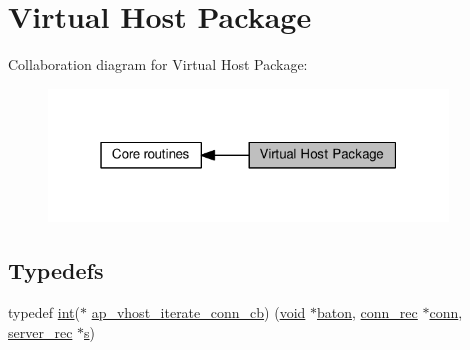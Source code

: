 \hypertarget{group__APACHE__CORE__VHOST}{}\section{Virtual Host Package}
\label{group__APACHE__CORE__VHOST}
Collaboration diagram for Virtual Host Package\+:
\nopagebreak
\begin{figure}[H]
\begin{center}
\leavevmode
\includegraphics[width=301pt]{group__APACHE__CORE__VHOST}
\end{center}
\end{figure}
\subsection*{Typedefs}
\begin{DoxyCompactItemize}
\item 
typedef \hyperlink{pcre_8txt_a42dfa4ff673c82d8efe7144098fbc198}{int}($\ast$ \hyperlink{group__APACHE__CORE__VHOST_gab90f6f97cd2bc1538be783916fad41bb}{ap\+\_\+vhost\+\_\+iterate\+\_\+conn\+\_\+cb}) (\hyperlink{group__MOD__ISAPI_gacd6cdbf73df3d9eed42fa493d9b621a6}{void} $\ast$\hyperlink{group__APR__Util__RC_ga37840dc44e2b0b5a127a6828fffe2a8c}{baton}, \hyperlink{structconn__rec}{conn\+\_\+rec} $\ast$\hyperlink{group__MOD__PROXY_gaf26a520a5f2c0d567cd7732f04c925c2}{conn}, \hyperlink{structserver__rec}{server\+\_\+rec} $\ast$\hyperlink{pcretest_8txt_a062597889ba244b72877454b1d3adecf}{s})
\end{DoxyCompactItemize}
